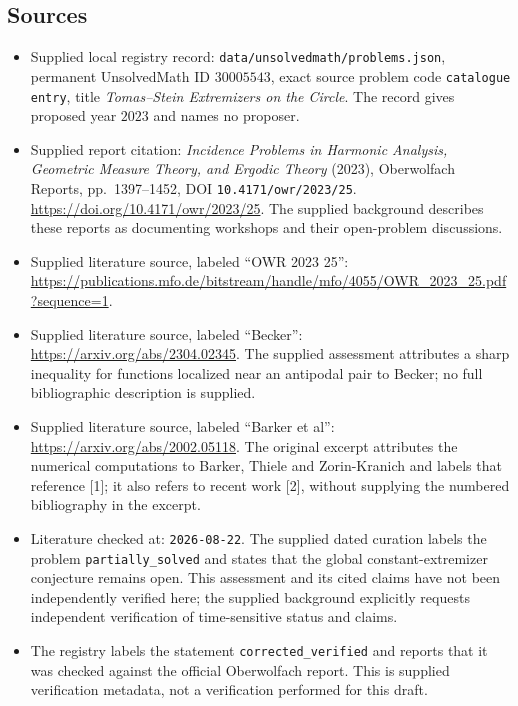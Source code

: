 \documentclass[11pt]{article}
\begin{document}
\subsection{Sources}
\begin{itemize}
\item Supplied local registry record: \texttt{data/unsolvedmath/problems.json}, permanent UnsolvedMath ID \(30005543\), exact source problem code \texttt{catalogue entry}, title \emph{Tomas--Stein Extremizers on the Circle}. The record gives proposed year \(2023\) and names no proposer.
\item Supplied report citation: \emph{Incidence Problems in Harmonic Analysis, Geometric Measure Theory, and Ergodic Theory} (2023), Oberwolfach Reports, pp.~1397--1452, DOI \texttt{10.4171/owr/2023/25}. \url{https://doi.org/10.4171/owr/2023/25}. The supplied background describes these reports as documenting workshops and their open-problem discussions.
\item Supplied literature source, labeled ``OWR 2023 25'': \url{https://publications.mfo.de/bitstream/handle/mfo/4055/OWR_2023_25.pdf?sequence=1}.
\item Supplied literature source, labeled ``Becker'': \url{https://arxiv.org/abs/2304.02345}. The supplied assessment attributes a sharp inequality for functions localized near an antipodal pair to Becker; no full bibliographic description is supplied.
\item Supplied literature source, labeled ``Barker et al'': \url{https://arxiv.org/abs/2002.05118}. The original excerpt attributes the numerical computations to Barker, Thiele and Zorin-Kranich and labels that reference [1]; it also refers to recent work [2], without supplying the numbered bibliography in the excerpt.
\item Literature checked at: \texttt{2026-08-22}. The supplied dated curation labels the problem \texttt{partially\_solved} and states that the global constant-extremizer conjecture remains open. This assessment and its cited claims have not been independently verified here; the supplied background explicitly requests independent verification of time-sensitive status and claims.
\item The registry labels the statement \texttt{corrected\_verified} and reports that it was checked against the official Oberwolfach report. This is supplied verification metadata, not a verification performed for this draft.
\end{itemize}
\end{document}
